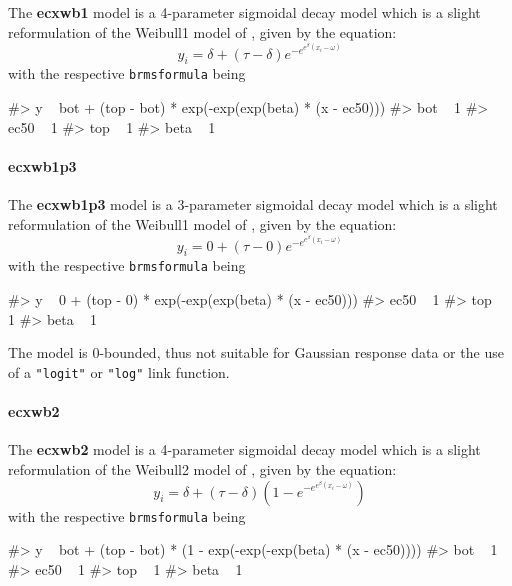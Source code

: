 The \textbf{ecxwb1} model is a 4-parameter sigmoidal decay model which
is a slight reformulation of the Weibull1 model of \citet{Ritz2016},
given by the equation:
\[y_i = \delta + (\tau - \delta) e^{-e^{e^{\beta} (x_i - \omega)}}\]
with the respective \texttt{brmsformula} being

\begin{Schunk}
\begin{Soutput}
#> y ~ bot + (top - bot) * exp(-exp(exp(beta) * (x - ec50))) 
#> bot ~ 1
#> ec50 ~ 1
#> top ~ 1
#> beta ~ 1
\end{Soutput}
\end{Schunk}

\hypertarget{ecxwb1p3}{%
\paragraph{ecxwb1p3}\label{ecxwb1p3}}

The \textbf{ecxwb1p3} model is a 3-parameter sigmoidal decay model which
is a slight reformulation of the Weibull1 model of \citet{Ritz2016},
given by the equation:
\[y_i = {0} + (\tau - {0}) e^{-e^{e^{\beta} (x_i - \omega)}}\] with the
respective \texttt{brmsformula} being

\begin{Schunk}
\begin{Soutput}
#> y ~ 0 + (top - 0) * exp(-exp(exp(beta) * (x - ec50))) 
#> ec50 ~ 1
#> top ~ 1
#> beta ~ 1
\end{Soutput}
\end{Schunk}

The model is 0-bounded, thus not suitable for Gaussian response data or
the use of a \texttt{"logit"} or \texttt{"log"} link function.

\hypertarget{ecxwb2}{%
\paragraph{ecxwb2}\label{ecxwb2}}

The \textbf{ecxwb2} model is a 4-parameter sigmoidal decay model which
is a slight reformulation of the Weibull2 model of \citet{Ritz2016},
given by the equation:
\[y_i = \delta + (\tau - \delta) (1 - e^{-e^{e^{\beta} (x_i - \omega)}})\]
with the respective \texttt{brmsformula} being

\begin{Schunk}
\begin{Soutput}
#> y ~ bot + (top - bot) * (1 - exp(-exp(-exp(beta) * (x - ec50)))) 
#> bot ~ 1
#> ec50 ~ 1
#> top ~ 1
#> beta ~ 1
\end{Soutput}
\end{Schunk}

